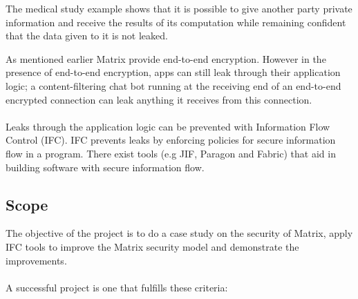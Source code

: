 


The medical study example shows that it is possible to give
another party private information and receive the results of its
computation while remaining confident that the data given to
it is not leaked.

As mentioned earlier Matrix provide end-to-end encryption. However in the presence of end-to-end encryption, apps can still leak through their application logic; a content-filtering chat bot running at the receiving end of an end-to-end encrypted connection can leak anything it receives from this connection.
\\
\\
Leaks through the application logic can be prevented with Information Flow Control (IFC). IFC prevents leaks by enforcing policies for secure information flow in a program. There exist tools (e.g JIF, Paragon and Fabric) that aid in building software with secure information flow. 

\subsection{Scope} %
The objective of the project is to do a case study on the security of Matrix, apply IFC tools to improve the Matrix security model and demonstrate the improvements. 
\\
\\
A successful project is one that fulfills these criteria: 

